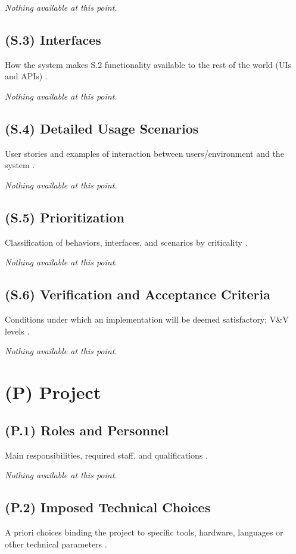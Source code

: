 \documentclass[12pt,letterpaper]{article}
\begin{document}
\textit{Nothing available at this point.}

\subsection{(S.3) Interfaces}
How the system makes S.2 functionality available to the rest of the world (UIs and APIs) \cite{meyer2022}.

\textit{Nothing available at this point.}

\subsection{(S.4) Detailed Usage Scenarios}
User stories and examples of interaction between users/environment and the system \cite{meyer2022}.

\textit{Nothing available at this point.}

\subsection{(S.5) Prioritization}
Classification of behaviors, interfaces, and scenarios by criticality \cite{meyer2022}.

\textit{Nothing available at this point.}

\subsection{(S.6) Verification and Acceptance Criteria}
Conditions under which an implementation will be deemed satisfactory; V\&V levels \cite{meyer2022}.

\textit{Nothing available at this point.}

\clearpage

\section{(P) Project}

\subsection{(P.1) Roles and Personnel}
Main responsibilities, required staff, and qualifications \cite{meyer2022}.

\textit{Nothing available at this point.}

\subsection{(P.2) Imposed Technical Choices}
A priori choices binding the project to specific tools, hardware, languages or other technical parameters \cite{meyer2022}.
\end{document}
